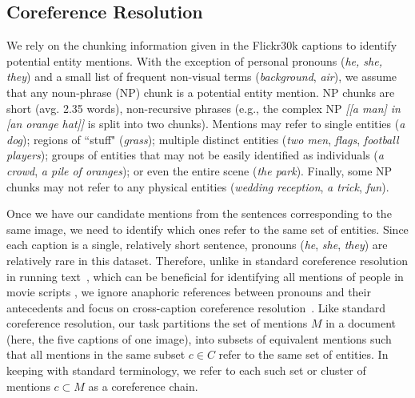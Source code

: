\documentclass[twocolumn]{svjour3}
\begin{document}
\subsection{Coreference Resolution}  \label{sec:coref}

We rely on the chunking information given in the Flickr30k captions \citep{young2014image} to identify potential entity mentions. With the exception of personal pronouns (\textit{he, she, they}) and a small list of frequent non-visual terms (\textit{background}, \textit{air}), we assume that any noun-phrase (NP) chunk is a potential entity mention. NP chunks are short (avg. 2.35 words), non-recursive phrases (e.g., the complex NP \textit{[[a man] in [an orange hat]]} is split into two chunks). Mentions may refer to single entities (\textit{a dog}); regions of ``stuff" (\textit{grass}); multiple distinct entities (\textit{two men}, \textit{flags}, \textit{football players}); groups of entities that may not be easily identified as individuals ({\em a crowd}, \textit{a pile of oranges}); or even the entire scene (\textit{the park}). Finally, some NP chunks may not refer to any physical entities (\textit{wedding reception}, \textit{a trick}, \textit{fun}).  

Once we have our candidate mentions from the sentences corresponding to the same image, we need to identify which ones refer to the same set of entities. Since each caption is a single, relatively short sentence, pronouns (\textit{he}, \textit{she}, \textit{they}) are relatively rare in this dataset. Therefore, unlike in standard coreference resolution in running text~\citep{soon2001machine}, which can be beneficial for identifying all mentions of people in movie scripts \citep{RamanathanJLF14}, we ignore anaphoric references between pronouns and their antecedents and focus on cross-caption coreference resolution~\citep{hodosh2010cross}.  Like standard coreference resolution, our task partitions the set of mentions $M$ in a document (here, the five captions of one image), into subsets of equivalent mentions such that all mentions in the same subset $c \in C$ refer to the same set of entities. In keeping with standard terminology, we refer to each such set or cluster of mentions $c \subset M$ as a coreference chain. 
\end{document}
